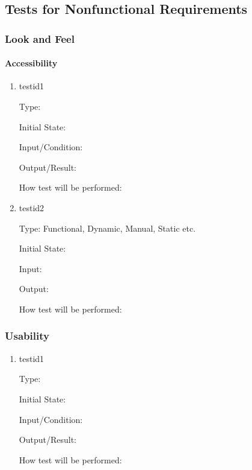 \documentclass[12pt, titlepage]{article}
\begin{document}
\subsection{Tests for Nonfunctional Requirements}

\subsubsection{Look and Feel}
		
\paragraph{Accessibility}

\begin{enumerate}

\item{testid1\\}

Type: 
					
Initial State: 
					
Input/Condition: 
					
Output/Result: 
					
How test will be performed: 
		
\item{testid2\\}

Type: Functional, Dynamic, Manual, Static etc.
					
Initial State: 
					
Input: 
					
Output: 
					
How test will be performed: 

\end{enumerate}

\subsubsection{Usability}

\begin{enumerate}

\item{testid1\\}

Type: 
					
Initial State: 
					
Input/Condition: 
					
Output/Result: 
					
How test will be performed: 

\end{enumerate}
\end{document}
